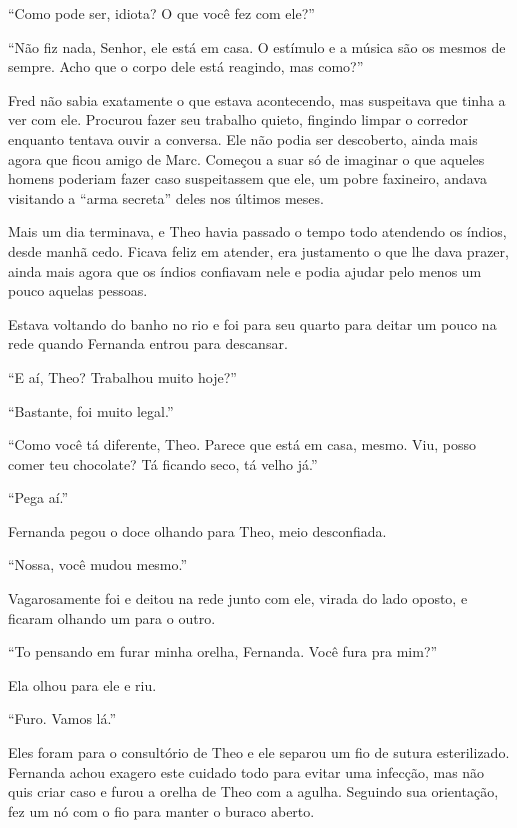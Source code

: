 ``Como pode ser, idiota? O que você fez com ele?''

``Não fiz nada, Senhor, ele está em casa. O estímulo e a música são os
mesmos de sempre. Acho que o corpo dele está reagindo, mas
como?''

Fred não sabia exatamente o que estava acontecendo, mas suspeitava que
tinha a ver com ele. Procurou fazer seu trabalho quieto, fingindo limpar
o corredor enquanto tentava ouvir a conversa. Ele não podia ser
descoberto, ainda mais agora que ficou amigo de Marc. Começou a suar só
de imaginar o que aqueles homens poderiam fazer caso suspeitassem que
ele, um pobre faxineiro, andava visitando a ``arma secreta'' deles nos
últimos meses.

\asterisc


Mais um dia terminava, e Theo havia passado o tempo todo atendendo os
índios, desde manhã cedo. Ficava feliz em atender, era
justamento o que lhe dava prazer, ainda mais agora que os índios
confiavam nele e podia ajudar pelo menos um pouco aquelas pessoas.

Estava voltando do banho no rio e foi para seu quarto para deitar um
pouco na rede quando Fernanda entrou para descansar.

``E aí, Theo? Trabalhou muito hoje?''

``Bastante, foi muito legal.''

``Como você tá diferente, Theo. Parece que está em casa, mesmo. Viu,
posso comer teu chocolate? Tá ficando seco, tá velho já.''

``Pega aí.''

Fernanda pegou o doce olhando para Theo, meio desconfiada.

``Nossa, você mudou mesmo.''

Vagarosamente foi e deitou na rede junto com ele, virada do lado oposto,
e ficaram olhando um para o outro.

``To pensando em furar minha orelha, Fernanda. Você fura pra mim?''

Ela olhou para ele e riu.

``Furo. Vamos lá.''

Eles foram para o consultório de Theo e ele separou um fio de sutura
esterilizado. Fernanda achou exagero este cuidado todo para evitar uma
infecção, mas não quis criar caso e furou a orelha de Theo com a agulha.
Seguindo sua orientação, fez um nó com o fio para manter o buraco
aberto.

